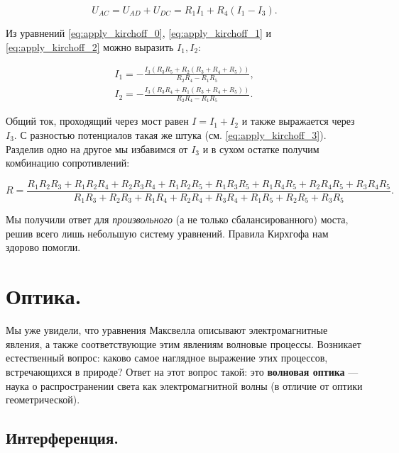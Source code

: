 \documentclass[12pt,a4paper]{article}
\numberwithin{equation}{section}
\numberwithin{equation}{section}
\newcommand{\nn}{\nonumber}
\begin{document}
\begin{equation}
  \label{eq:apply_kirchoff_3}
  U_{AC} = U_{AD} + U_{DC} = R_1 I_1 + R_4 (I_1 -I_3).
\end{equation}

Из уравнений \eqref{eq:apply_kirchoff_0}, \eqref{eq:apply_kirchoff_1}
и \eqref{eq:apply_kirchoff_2} можно выразить $I_1, I_2$:

\begin{eqnarray}
  \label{eq:apply_kirchoff_currents}
  \nn
  I_1 = -\frac{I_3 (R_3 R_5 + R_2 (R_3 + R_4 + R_5))}{R_2 R_4 -R_1
    R_5},\\
  I_2 = -\frac{I_3 (R_3 R_4 + R_1 (R_3 + R_4 + R_5))}{R_2 R_4 -R_1
    R_5}.
\end{eqnarray}

Общий ток, проходящий через мост равен $I=I_1 + I_2$ и также
выражается через $I_3$. С разностью потенциалов такая же штука
(см. \eqref{eq:apply_kirchoff_3}). Разделив одно на другое мы
избавимся от $I_3$ и в сухом остатке получим комбинацию сопротивлений:

\begin{equation}
  \label{eq:bridge_answer}
  R = \frac{R_1 R_2 R_3 + R_1 R_2 R_4 + R_2 R_3 R_4 + R_1 R_2 R_5 +
    R_1 R_3 R_5 + R_1 R_4 R_5 + R_2 R_4 R_5 + R_3 R_4 R_5}{R_1 R_3 + R_2 R_3 + R_1 R_4 + R_2 R_4 + R_3 R_4 + R_1
    R_5 + R_2 R_5 + R_3 R_5}.
\end{equation}

Мы получили ответ для \textit{произвольного} (а не только
сбалансированного) моста, решив всего лишь небольшую систему
уравнений. Правила Кирхгофа нам здорово помогли. 

\section{Оптика.}
\label{sec:optics}

Мы уже увидели, что уравнения Максвелла описывают электромагнитные
явления, а также соответствующие этим явлениям волновые
процессы. Возникает естественный вопрос: каково самое наглядное
выражение этих процессов, встречающихся в природе? Ответ на этот
вопрос такой: это \textbf{волновая оптика} --- наука о распространении света
как электромагнитной волны (в отличие от оптики геометрической). 

\subsection{Интерференция.}
\label{sec:interference}
\end{document}
